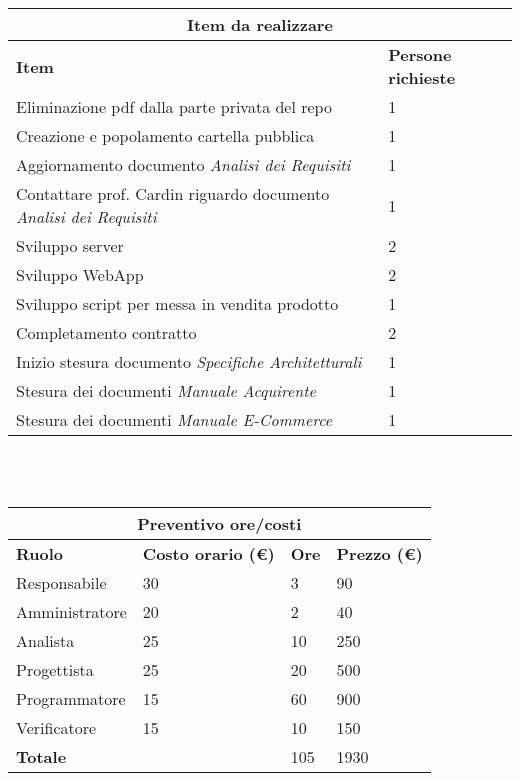 \documentclass[a4paper, 12pt]{article}
\begin{document}
\begin{center}
    \begin{tabularx}{\textwidth}{|X|X|}
        \hline
        \multicolumn{2}{|c|}{\textbf{Item da realizzare}}\\
        \hline
        \hline
        \textbf{Item} & \textbf{Persone richieste}\\
        \hline
        Eliminazione pdf dalla parte privata del repo & 1\\
        \hline
        Creazione e popolamento cartella pubblica & 1\\
        \hline
        Aggiornamento documento \textit{Analisi dei Requisiti} & 1\\
        \hline
        Contattare prof. Cardin riguardo documento \textit{Analisi dei Requisiti} & 1\\
        \hline
        Sviluppo server & 2\\
        \hline
        Sviluppo WebApp & 2\\
        \hline
        Sviluppo script per messa in vendita prodotto & 1\\
        \hline
        Completamento contratto & 2\\
        \hline
        Inizio stesura documento \textit{Specifiche Architetturali} & 1\\
        \hline
        Stesura dei documenti \textit{Manuale Acquirente} & 1\\
        \hline
        Stesura dei documenti \textit{Manuale E-Commerce} & 1\\
        \hline
    \end{tabularx}\\[8pt]
    \mbox{}\\
\end{center}

\begin{center}
    \begin{tabularx}{\textwidth}{|X|X|X|X|}
        \hline
        \multicolumn{4}{|c|}{\textbf{Preventivo ore/costi}}\\
        \hline
        \hline
        \textbf{Ruolo} & \textbf{Costo orario (\euro)} & \textbf{Ore} & \textbf{Prezzo (\euro)}\\
        \hline
        Responsabile    & 30 & 3  & 90\\
        \hline
        Amministratore  & 20 & 2  & 40\\
        \hline
        Analista        & 25 & 10  & 250\\
        \hline
        Progettista     & 25 & 20  & 500\\
        \hline
        Programmatore   & 15 & 60  & 900\\
        \hline
        Verificatore    & 15 & 10  & 150\\
        \hline
        \hline
        \textbf{Totale} &    & 105 & 1930\\
        \hline
    \end{tabularx}\\[8pt]
    \mbox{}\\
\end{center}
\end{document}
